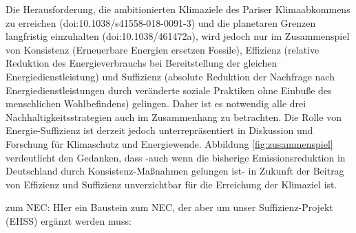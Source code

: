
Die Herausforderung, die ambitionierten Klimaziele des Pariser Klimaabkommens zu erreichen (doi:10.1038/s41558-018-0091-3) und die planetaren Grenzen langfristig einzuhalten (doi:10.1038/461472a), wird jedoch nur im Zusammenspiel von Konsistenz (Erneuerbare Energien ersetzen Fossile), Effizienz (relative Reduktion des Energieverbrauchs bei Bereitstellung der gleichen Energiedienstleistung) und Suffizienz (absolute Reduktion der Nachfrage nach Energiedienstleistungen durch veränderte soziale Praktiken ohne Einbuße des menschlichen Wohlbefindens) gelingen. Daher ist es notwendig alle drei Nachhaltigkeitsstrategien auch im Zusammenhang zu betrachten. Die Rolle von Energie-Suffizienz ist derzeit jedoch unterrepräsentiert in Diskussion und Forschung für Klimaschutz und Energiewende. Abbildung \ref{fig:zusammenspiel} verdeutlicht den Gedanken, dass -auch wenn die bisherige Emissionsreduktion in Deutschland durch Konsistenz-Maßnahmen gelungen ist- in Zukunft der Beitrag von Effizienz und Suffizienz unverzichtbar für die Erreichung der Klimaziel ist.


zum NEC:
HIer ein Baustein zum NEC, der aber um unser Suffizienz-Projekt (EHSS) ergänzt werden muss:

